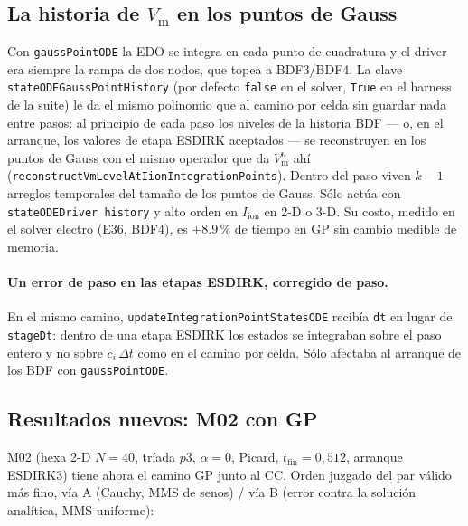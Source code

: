 \documentclass[11pt,a4paper]{article}
\newcommand{\code}[1]{\texttt{\small #1}}
\newcommand{\Vm}{V_{\text{m}}}
\newcommand{\Iion}{I_{\mathrm{ion}}}
\begin{document}
\subsection{La historia de \texorpdfstring{$\Vm$}{Vm} en los puntos de Gauss}
\label{sec:oct-gausshist}

Con \code{gaussPointODE} la EDO se integra en cada punto de cuadratura y el driver era siempre
la rampa de dos nodos, que topea a BDF3/BDF4. La clave \code{stateODEGaussPointHistory} (por
defecto \code{false} en el solver, \code{True} en el harness de la suite) le da el mismo
polinomio que al camino por celda sin guardar nada entre pasos: al principio de cada paso los
niveles de la historia BDF --- o, en el arranque, los valores de etapa ESDIRK aceptados --- se
reconstruyen en los puntos de Gauss con el mismo operador que da $\Vm^n$ ahí
(\code{reconstructVmLevelAtIionIntegrationPoints}). Dentro del paso viven $k-1$ arreglos
temporales del tamaño de los puntos de Gauss. Sólo actúa con \code{stateODEDriver history} y
alto orden en $\Iion$ en 2-D o 3-D. Su costo, medido en el solver electro (E36, BDF4), es
$+8.9$\,\% de tiempo en GP sin cambio medible de memoria.

\paragraph{Un error de paso en las etapas ESDIRK, corregido de paso.} En el mismo camino,
\code{updateIntegrationPointStatesODE} recibía \code{dt} en lugar de \code{stageDt}: dentro de
una etapa ESDIRK los estados se integraban sobre el paso entero y no sobre $c_i\,\Delta t$ como
en el camino por celda. Sólo afectaba al arranque de los BDF con \code{gaussPointODE}.

\subsection{Resultados nuevos: M02 con GP}
\label{sec:oct-results}

M02 (hexa 2-D $N=40$, tríada $p3$, $\alpha=0$, Picard, $t_{\text{fin}}=0{,}512$, arranque
ESDIRK3) tiene ahora el camino GP junto al CC. Orden juzgado del par válido más fino, vía A
(Cauchy, MMS de senos) / vía B (error contra la solución analítica, MMS uniforme):
\end{document}

